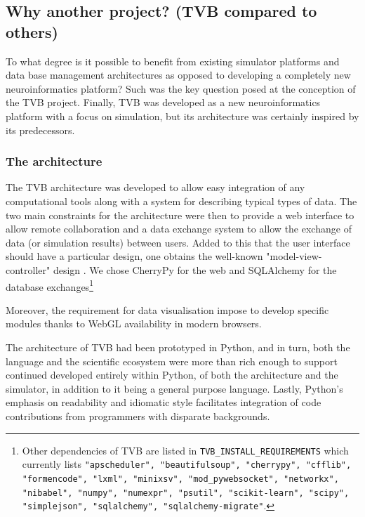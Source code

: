 \subsection{Why another project? (TVB compared to others)}

To what degree is it possible to benefit from existing simulator platforms and
data base management architectures as opposed to developing a completely new
neuroinformatics platform? Such was the key question posed at the conception of
the TVB project. Finally, TVB was developed as a new neuroinformatics platform
with a focus on simulation, but its architecture was certainly inspired by its
predecessors.

\subsubsection{The architecture}


The TVB architecture was developed to allow easy integration of any
computational tools along with a system for describing typical types of data.
The two main constraints for the architecture were then to provide a web
interface to allow remote collaboration and a data exchange system to allow the
exchange of data (or simulation results) between users. Added to this that
the user interface should have a particular design, one obtains the well-known
"model-view-controller" design .  We chose
\textsf{CherryPy} for the web  and \textsf{SQLAlchemy} for the database
exchanges\footnote{Other dependencies of TVB are listed in
    \texttt{TVB\_INSTALL\_REQUIREMENTS} which currently lists
    \texttt{"apscheduler", "beautifulsoup", "cherrypy", "cfflib", "formencode",
        "lxml", "minixsv", "mod\_pywebsocket", "networkx", "nibabel", "numpy",
        "numexpr", "psutil", "scikit-learn", "scipy", "simplejson",
        "sqlalchemy", "sqlalchemy-migrate"}.}

Moreover, the requirement for data visualisation impose to develop specific
modules thanks to WebGL availability in modern browsers.

The architecture of TVB had been prototyped in Python, and in turn, both the
language and the scientific ecosystem were more than rich enough to support
continued developed entirely within Python, of both the architecture and the
simulator, in addition to it being a general purpose language. Lastly, Python's
emphasis on readability and idiomatic style facilitates integration of 
code contributions from programmers with disparate backgrounds.

